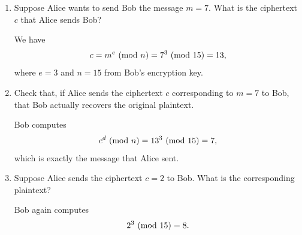 \documentclass[letterpaper]{article}
\begin{document}
\begin{mdframed}
\begin{enumerate}
        \item Suppose Alice wants to send Bob the message $m = 7$. What is the ciphertext $c$ that Alice sends Bob? 
        \begin{mdframed}
            We have \[c = m^e \ (\mathrm{mod}\ n) = 7^3 \ (\mathrm{mod}\ 15) = 13,\]
            where $e = 3$ and $n = 15$ from Bob's encryption key. 
        \end{mdframed}

        \item Check that, if Alice sends the ciphertext $c$ corresponding to $m = 7$ to Bob, that Bob actually recovers the original plaintext. 
        \begin{mdframed}
            Bob computes \[c^d \ (\mathrm{mod}\ n) = 13^3 \ (\mathrm{mod}\ 15) = 7,\] which is exactly the message that Alice sent.
        \end{mdframed}

        \item Suppose Alice sends the ciphertext $c = 2$ to Bob. What is the corresponding plaintext? 
        \begin{mdframed}
            Bob again computes \[2^3 \ (\mathrm{mod}\ 15) = 8.\]
        \end{mdframed}
    \end{enumerate}
\end{mdframed}
\end{document}
